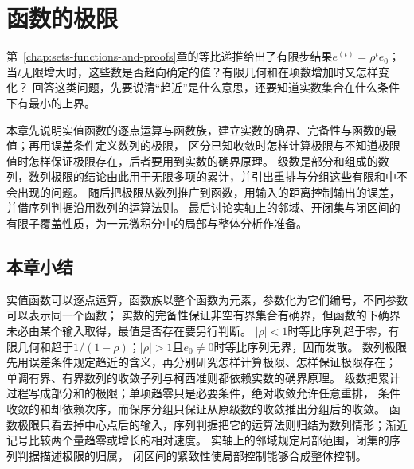 \chapter{函数的极限}
\label{chap:function-limits}
\label{chap:mathematical-analysis}

第~\ref{chap:sets-functions-and-proofs}章的等比递推给出了有限步结果$e^{(t)}=\rho^te_0$；
当$t$无限增大时，这些数是否趋向确定的值？有限几何和在项数增加时又怎样变化？
回答这类问题，先要说清“趋近”是什么意思，还要知道实数集合在什么条件下有最小的上界。

本章先说明实值函数的逐点运算与函数族，建立实数的确界、完备性与函数的最值；再用误差条件定义数列的极限，
区分已知收敛时怎样计算极限与不知道极限值时怎样保证极限存在，后者要用到实数的确界原理。
级数是部分和组成的数列，数列极限的结论由此用于无限多项的累计，并引出重排与分组这些有限和中不会出现的问题。
随后把极限从数列推广到函数，用输入的距离控制输出的误差，并借序列判据沿用数列的运算法则。
最后讨论实轴上的邻域、开闭集与闭区间的有限子覆盖性质，为一元微积分中的局部与整体分析作准备。







\FloatBarrier
\section{本章小结}
\label{sec:function-limits-summary}

实值函数可以逐点运算，函数族以整个函数为元素，参数化为它们编号，不同参数可以表示同一个函数；
实数的完备性保证非空有界集合有确界，但函数的下确界未必由某个输入取得，最值是否存在要另行判断。
$|\rho|<1$时等比序列趋于零，有限几何和趋于$1/(1-\rho)$；$|\rho|>1$且$e_0\neq0$时等比序列无界，因而发散。
数列极限先用误差条件规定趋近的含义，再分别研究怎样计算极限、怎样保证极限存在；
单调有界、有界数列的收敛子列与柯西准则都依赖实数的确界原理。
级数把累计过程写成部分和的极限；单项趋零只是必要条件，绝对收敛允许任意重排，
条件收敛的和却依赖次序，而保序分组只保证从原级数的收敛推出分组后的收敛。
函数极限只看去掉中心点后的输入，序列判据把它的运算法则归结为数列情形；渐近记号比较两个量趋零或增长的相对速度。
实轴上的邻域规定局部范围，闭集的序列判据描述极限的归属，
闭区间的紧致性使局部控制能够合成整体控制。
